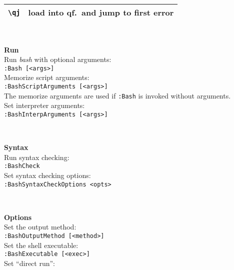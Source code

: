 \documentclass[oneside,11pt,landscape,DIV16]{scrartcl}
\begin{document}
\begin{multicols}{3}
\begin{center}
\begin{tabular}[]{|p{11mm}|p{60mm}|}
\hline \verb'\qj'  & load into qf.~and jump to first error \\
\hline
\end{tabular}\\[2.5ex]
%
\begin{minipage}[b]{72mm}%
\large{\textbf{Run}}\\[1.0ex]
Run \textit{bash} with optional arguments: \\[0.5ex]
\texttt{:Bash [<args>]} \\[1.0ex]
Memorize script arguments: \\[0.5ex]
\texttt{:BashScriptArguments [<args>]} \\[0.5ex]
The memorize arguments are used if \texttt{:Bash} is invoked without arguments. \\[1.0ex]
Set interpreter arguments: \\[0.5ex]
\texttt{:BashInterpArguments [<args>]}
\end{minipage}
\\[2.5ex]
%
\begin{minipage}[b]{72mm}%
\large{\textbf{Syntax}}\\[1.0ex]
Run syntax checking: \\[0.5ex]
\texttt{:BashCheck} \\[1.0ex]
Set syntax checking options: \\[0.5ex]
\texttt{:BashSyntaxCheckOptions <opts>}
\end{minipage}
\\[2.5ex]
%
\begin{minipage}[b]{72mm}%
\large{\textbf{Options}}\\[1.0ex]
Set the output method: \\[0.5ex]
\texttt{:BashOutputMethod [<method>]} \\[1.0ex]
Set the shell executable: \\[0.5ex]
\texttt{:BashExecutable [<exec>]} \\[1.0ex]
Set ``direct run'': \\[0.5ex]

\end{minipage}
\end{center}
\end{multicols}
\end{document}
